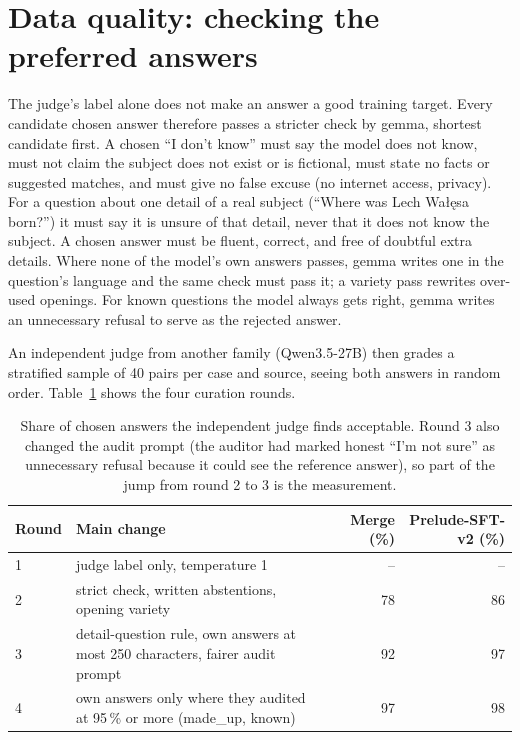 \documentclass[11pt,a4paper]{article}
\begin{document}
\section{Data quality: checking the preferred answers}
\label{sec:quality}

The judge's label alone does not make an answer a good training target.
Every candidate chosen answer therefore passes a stricter check by gemma, shortest candidate first.
A chosen ``I don't know'' must say the model does not know, must not claim the subject does not exist or is fictional, must state no facts or suggested matches, and must give no false excuse (no internet access, privacy).
For a question about one detail of a real subject (``Where was Lech Wa\l\k{e}sa born?'') it must say it is unsure of that detail, never that it does not know the subject.
A chosen answer must be fluent, correct, and free of doubtful extra details.
Where none of the model's own answers passes, gemma writes one in the question's language and the same check must pass it; a variety pass rewrites over-used openings.
For known questions the model always gets right, gemma writes an unnecessary refusal to serve as the rejected answer.

An independent judge from another family (Qwen3.5-27B) then grades a stratified sample of 40 pairs per case and source, seeing both answers in random order.
Table~\ref{tab:rounds} shows the four curation rounds.

\begin{table}[t]
\centering
\small
\begin{tabularx}{\linewidth}{@{}lXrr@{}}
\toprule
Round & Main change & Merge (\%) & Prelude-SFT-v2 (\%) \\
\midrule
1 & judge label only, temperature 1 & -- & -- \\
2 & strict check, written abstentions, opening variety & 78 & 86 \\
3 & detail-question rule, own answers at most 250 characters, fairer audit prompt & 92 & 97 \\
4 & own answers only where they audited at 95\,\% or more (made\_up, known) & 97 & 98 \\
\bottomrule
\end{tabularx}
\caption{Share of chosen answers the independent judge finds acceptable. Round 3 also changed the audit prompt (the auditor had marked honest ``I'm not sure'' as unnecessary refusal because it could see the reference answer), so part of the jump from round 2 to 3 is the measurement.}
\label{tab:rounds}
\end{table}
\end{document}
